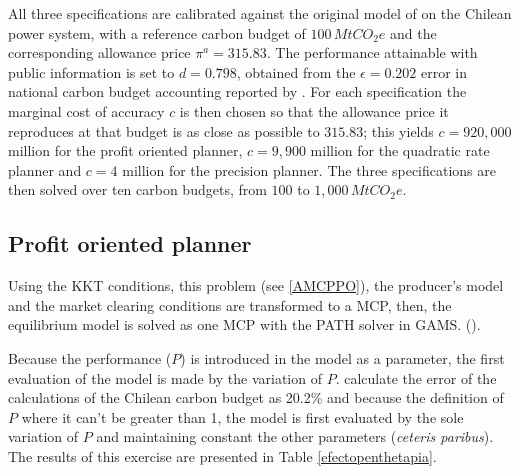 \documentclass[a4paper,fleqn]{cas-dc}
\begin{document}
All three specifications are calibrated against the original model of \citet{amigo_two_2021} on the Chilean power system, with a reference carbon budget of $100\,MtCO_2e$ and the corresponding allowance price $\pi^a=315.83$. The performance attainable with public information is set to $d=0.798$, obtained from the $\epsilon=0.202$ error in national carbon budget accounting reported by \citet{andres_new_2014}. For each specification the marginal cost of accuracy $c$ is then chosen so that the allowance price it reproduces at that budget is as close as possible to $315.83$; this yields $c=920{,}000$ million for the profit oriented planner, $c=9{,}900$ million for the quadratic rate planner and $c=4$ million for the precision planner. The three specifications are then solved over ten carbon budgets, from $100$ to $1{,}000\,MtCO_2e$.



\subsection{Profit oriented planner}\label{subsec:resultsPO}
\vspace{2.5mm}
Using the KKT conditions, this problem (see \ref{AMCPPO}), the producer's model and the market clearing conditions are transformed to a MCP, then, the equilibrium model is solved as one MCP with the PATH solver in GAMS. (\cite{ferris_complementarity_2000}). 

Because the performance ($P$) is introduced in the model as a parameter, the first evaluation of the model is made by the variation of $P$. \cite{andres_new_2014} calculate the error of the calculations of the Chilean carbon budget as 20.2\% and because the definition of $P$ where it can't be greater than 1, the model is first evaluated by the sole variation of $P$ and maintaining constant the other parameters (\textit{ceteris paribus}). The results of this exercise are presented in Table \ref{efectopenthetapia}.
\end{document}
